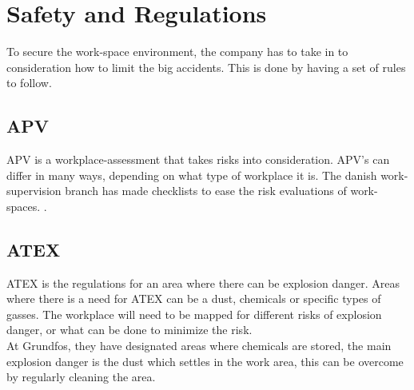 \section{Safety and Regulations}\label{ch:regulation}
To secure the work-space environment, the company has to take in to consideration how to limit the big accidents. This is done by having a set of rules to follow.\\

\subsection{APV}
APV is a workplace-assessment that takes risks into consideration. APV's can differ in many ways, depending on what type of workplace it is. The danish work-supervision branch has made checklists to ease the risk evaluations of work-spaces. \cite{Apv}\cite{Risikovurdering}.\\


\subsection{ATEX}
ATEX is the regulations for an area where there can be explosion danger. Areas where there is a need for ATEX can be a dust, chemicals or specific types of gasses. The workplace will need to be mapped for different risks of explosion danger, or what can be done to minimize the risk.\\
At Grundfos, they have designated areas where chemicals are stored, the main explosion danger is the dust which settles in the work area, this can be overcome by regularly cleaning the area\cite{ATEX}.  

